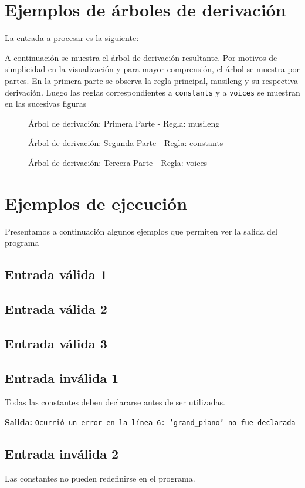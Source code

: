 \documentclass[a4paper,8pt]{article}
\newcommand{\ponerGrafico}[4]
{\begin{figure}[H]
	\centering
	\subfloat{\texttt{[image: \#1]}}
	\caption{#2} \label{fig:#4}
\end{figure}
}
\begin{document}
\newpage
\section{Ejemplos de árboles de derivación}
La entrada a procesar es la siguiente: 
\begin{small}
  
\end{small}

A continuación se muestra el árbol de derivación resultante. Por motivos de simplicidad en la visualización y para mayor comprensión, el árbol se muestra por partes. En la primera parte se observa la regla principal, musileng y su respectiva derivación. Luego las reglas correspondientes a \texttt{constants} y a \texttt{voices} se muestran en las sucesivas figuras
\ponerGrafico{tree1_musileng.png}{Árbol de derivación: Primera Parte - Regla: musileng}{0.8}{}
\ponerGrafico{tree1_constants.png}{Árbol de derivación: Segunda Parte - Regla: constants}{0.9}{}
\ponerGrafico{tree1_voices.png}{Árbol de derivación: Tercera Parte - Regla: voices}{0.8}{}

\section{Ejemplos de ejecución}
Presentamos a continuación algunos ejemplos que permiten ver la salida del programa
\subsection{Entrada válida 1}
\subsection{Entrada válida 2}
\subsection{Entrada válida 3}
\subsection{Entrada inválida 1}
Todas las constantes deben declararse antes de ser utilizadas.
\begin{small}
  
\end{small}

\textbf{Salida:} \texttt{Ocurrió un error en la línea 6: 'grand\_piano' no fue declarada}


\subsection{Entrada inválida 2}
Las constantes no pueden redefinirse en el programa.
\begin{small}
  
\end{small}
\end{document}
